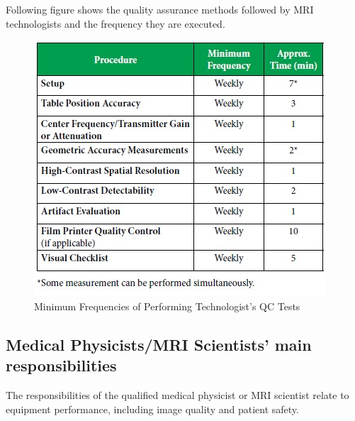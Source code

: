 \documentclass[12pt]{article}
\begin{document}
Following figure shows the quality assurance methods followed by MRI technologists and the frequency they are executed. 
\begin{figure}[h!]
    \centering
    \includegraphics[width=0.8\linewidth]{testlist.jpg}
    \caption{\small{Minimum Frequencies of Performing Technologist’s QC Tests}}
    \label{fig:Minimum Frequencies of Performing Technologist’s QC Tests}
\end{figure}
\subsection{Medical Physicists/MRI Scientists' main responsibilities}
The responsibilities of the qualified medical physicist or MRI scientist relate to equipment performance, including image quality and patient safety.
\end{document}
